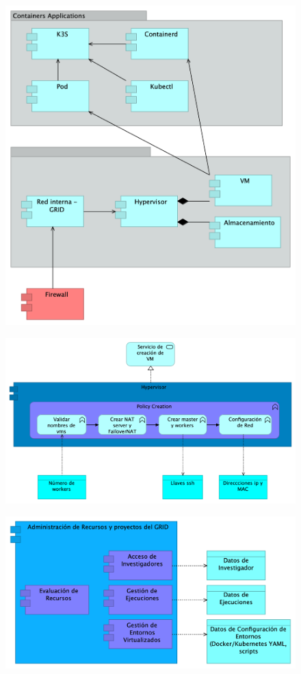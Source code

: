 \begin{figure}[H]
    \centering
    \includegraphics[width=\textwidth]{tablas-images/cp6/Application-Cooperation-View.png}
\end{figure}
\begin{figure}[H]
    \centering
    \includegraphics[width=\textwidth]{tablas-images/cp6/Application-Behaviour-view.png}
\end{figure}
\begin{figure}[H]
    \centering
    \includegraphics[width=\textwidth]{tablas-images/cp6/Application-Structure-View.png}
\end{figure}